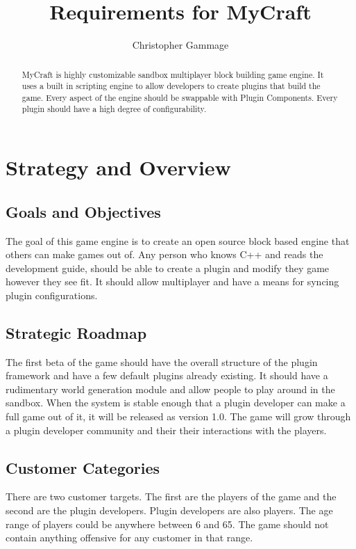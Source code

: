 \documentclass{article}
\begin{document}
\title{Requirements for MyCraft}
\author{Christopher Gammage}
\maketitle

\begin{abstract}
MyCraft is highly customizable sandbox multiplayer block building game engine.  It uses a built in scripting engine to allow developers to create plugins that build the game. 
Every aspect of the engine should be swappable with Plugin Components.  Every plugin should
have a high degree of configurability.   
\end{abstract}

\tableofcontents

\section{Strategy and Overview}
\subsection{Goals and Objectives}
The goal of this game engine is to create an open source block based engine that others
can make games out of.  Any person who knows C++ and reads the development guide, should
be able to create a plugin and modify they game however they see fit.  It should allow
multiplayer and have a means for syncing plugin configurations.
\subsection{Strategic Roadmap}
The first beta of the game should have the overall structure of the plugin framework
and have a few default plugins already existing.  It should have a rudimentary 
world generation module and allow people to play around in the sandbox.  When
the system is stable enough that a plugin developer can make a full game out of it, it
will be released as version 1.0.  The game will grow through a plugin developer 
community and their their interactions with the players.
\subsection{Customer Categories}
There are two customer targets.  The first are the players of the game and the second
are the plugin developers.  Plugin developers are also players.  The age range of players
could be anywhere between 6 and 65.  The game should not contain anything offensive for
any customer in that range.
\end{document}
